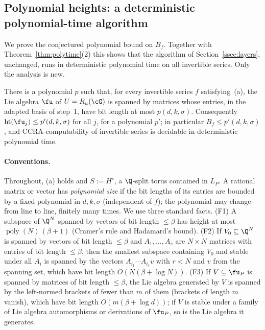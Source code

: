 \subsection{Polynomial heights: a deterministic polynomial-time algorithm}\label{ssec:detpoly}

We prove the conjectured polynomial bound on $B_f$. Together with Theorem~\ref{thm:polytime}(2)
this shows that the algorithm of Section~\ref{ssec:layers}, unchanged, runs in deterministic
polynomial time on all invertible series. Only the analysis is new.

\begin{theorem}\label{thm:detpoly}
There is a polynomial $p$ such that, for every invertible series $f$ satisfying~(a), the Lie algebra
$\fu$ of $U=R_u(\cG)$ is spanned by matrices whose entries, in the adapted basis of step~1, have bit
length at most $p(d,k,\sigma)$. Consequently $\operatorname{ht}(\fu_j)\le p'(d,k,\sigma)$ for all
$j$, for a polynomial $p'$; in particular $B_f\le p'(d,k,\sigma)$, and CCRA-computability of
invertible series is decidable in deterministic polynomial time.
\end{theorem}

\paragraph{Conventions.} Throughout, (a) holds and $S:=H^\circ$, a $\Q$-split torus contained in
$L_P$. A rational matrix or vector has \emph{polynomial size} if the bit lengths of its entries are
bounded by a fixed polynomial in $d,k,\sigma$ (independent of $f$); the polynomial may change from
line to line, finitely many times. We use three standard facts. (F1) A subspace of $\Q^N$ spanned by
vectors of bit length $\le\beta$ has height at most $\operatorname{poly}(N)\,(\beta+1)$ (Cramer's rule
and Hadamard's bound). (F2) If $V_0\subseteq\Q^N$ is spanned by vectors of bit length $\le\beta$ and
$A_1,\ldots,A_s$ are $N\times N$ matrices with entries of bit length $\le\beta$, then the smallest
subspace containing $V_0$ and stable under all $A_i$ is spanned by the vectors $A_{i_1}\cdots
A_{i_r}v$ with $r<N$ and $v$ from the spanning set, which have bit length $O(N(\beta+\log N))$.
(F3) If $V\subseteq\fu_P$ is spanned by matrices of bit length $\le\beta$, the Lie algebra generated
by $V$ is spanned by the left-normed brackets of fewer than $m$ of them (brackets of length $m$
vanish), which have bit length $O(m(\beta+\log d))$; if $V$ is stable under a family of Lie algebra
automorphisms or derivations of $\fu_P$, so is the Lie algebra it generates.

